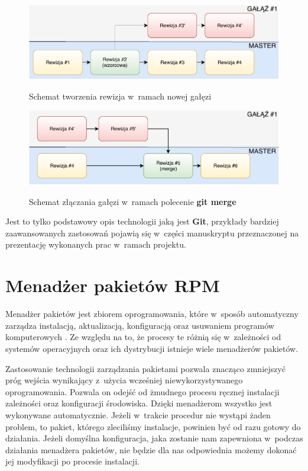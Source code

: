 \begin{figure} [H]
\centering
\caption{Schemat tworzenia rewizja w~ramach nowej gałęzi}
\includegraphics[width=\textwidth]{res/branch}
\label{fig:branch}
\end{figure}

\begin{figure} [H]
\centering
\caption{Schemat złączania gałęzi w~ramach polecenie \textbf{git merge}}
\includegraphics[width=\textwidth]{res/branchMerge}
\label{fig:branch}
\end{figure}

Jest to tylko podstawowy opis technologii jaką jest \textbf{Git}, przykłady bardziej zaawansowanych zastosowań pojawią się w~części manuskryptu przeznaczonej na prezentację wykonanych prac w~ramach projektu.


\section{Menadżer pakietów RPM}
Menadżer pakietów jest zbiorem oprogramowania, które w~sposób automatyczny zarządza instalacją, aktualizacją, konfiguracją oraz usuwaniem programów komputerowych \cite{ManagerWiki}. Ze względu na to, że procesy te różnią się w~zależności od systemów operacyjnych oraz ich dystrybucji istnieje wiele menadżerów pakietów.\par

Zastosowanie technologii zarządzania pakietami pozwala znacząco zmniejszyć próg wejścia wynikający z~użycia wcześniej niewykorzystywanego oprogramowania. Pozwala on odejść od żmudnego procesu ręcznej instalacji zależności oraz konfiguracji środowiska. Dzięki menadżerom wszystko jest wykonywane automatycznie. Jeżeli w~trakcie procedur nie wystąpi żaden problem, to pakiet, którego zleciliśmy instalacje, powinien być od razu gotowy do działania. Jeżeli domyślna konfiguracja, jaka zostanie nam zapewniona w~podczas działania menadżera pakietów, nie będzie dla nas odpowiednia możemy dokonać jej modyfikacji po procesie instalacji.

